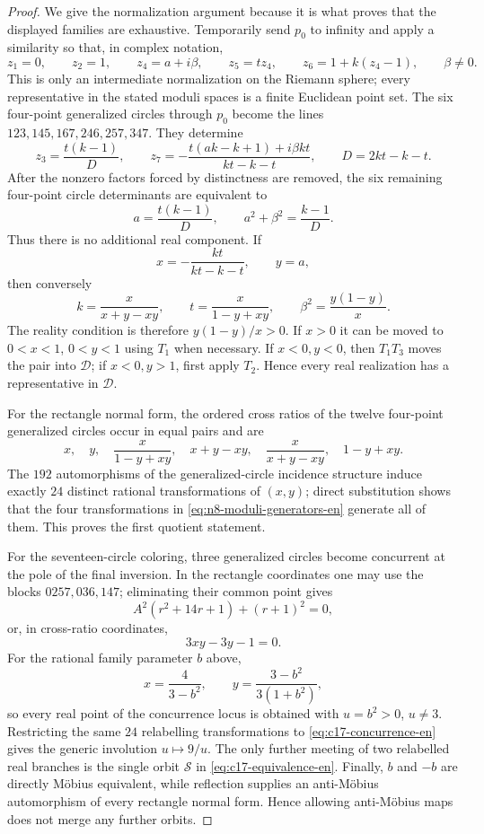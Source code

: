 \documentclass[11pt,a4paper]{article}
\theoremstyle{definition}
\begin{document}
\begin{proof}
We give the normalization argument because it is what proves that the displayed
families are exhaustive.  Temporarily send $p_0$ to infinity and apply a
similarity so that, in complex notation,
\[
z_1=0,\qquad z_2=1,\qquad z_4=a+i\beta,\qquad
z_5=t z_4,\qquad z_6=1+k(z_4-1),\qquad \beta\ne0.
\]
This is only an intermediate normalization on the Riemann sphere; every
representative in the stated moduli spaces is a finite Euclidean point set.
The six four-point generalized circles through $p_0$ become the lines
$123,145,167,246,257,347$.  They determine
\[
 z_3=\frac{t(k-1)}{D},\qquad
 z_7=-\frac{t(ak-k+1)+i\beta kt}{kt-k-t},\qquad
 D=2kt-k-t.
\]
After the nonzero factors forced by distinctness are removed, the six remaining
four-point circle determinants are equivalent to
\begin{equation}\label{eq:n8-normalized-equations-en}
 a=\frac{t(k-1)}D,\qquad a^2+\beta^2=\frac{k-1}D.
\end{equation}
Thus there is no additional real component.  If
\[
 x=-\frac{kt}{kt-k-t},\qquad y=a,
\]
then conversely
\[
k=\frac{x}{x+y-xy},\qquad
t=\frac{x}{1-y+xy},\qquad
\beta^2=\frac{y(1-y)}x.
\]
The reality condition is therefore $y(1-y)/x>0$.  If $x>0$ it can be moved to
$0<x<1$, $0<y<1$ using $T_1$ when necessary.  If $x<0,y<0$, then
$T_1T_3$ moves the pair into $\mathcal D$; if $x<0,y>1$, first apply $T_2$.
Hence every real realization has a representative in $\mathcal D$.

For the rectangle normal form, the ordered cross ratios of the twelve
four-point generalized circles occur in equal pairs and are
\[
x,\quad y,\quad \frac{x}{1-y+xy},\quad x+y-xy,
\quad\frac{x}{x+y-xy},\quad1-y+xy.
\]
The $192$ automorphisms of the generalized-circle incidence structure induce
exactly $24$ distinct rational transformations of $(x,y)$; direct substitution
shows that the four transformations in
\eqref{eq:n8-moduli-generators-en} generate all of them.  This proves the first
quotient statement.

For the seventeen-circle coloring, three generalized circles become concurrent
at the pole of the final inversion.  In the rectangle coordinates one may use
the blocks $0257,036,147$; eliminating their common point gives
\[
A^2(r^2+14r+1)+(r+1)^2=0,
\]
or, in cross-ratio coordinates,
\begin{equation}\label{eq:c17-concurrence-en}
3xy-3y-1=0.
\end{equation}
For the rational family parameter $b$ above,
\[
x=\frac4{3-b^2},\qquad
y=\frac{3-b^2}{3(1+b^2)},
\]
so every real point of the concurrence locus is obtained with
$u=b^2>0$, $u\ne3$.  Restricting the same $24$ relabelling transformations to
\eqref{eq:c17-concurrence-en} gives the generic involution $u\mapsto9/u$.
The only further meeting of two relabelled real branches is the single orbit
$\mathcal S$ in \eqref{eq:c17-equivalence-en}.  Finally, $b$ and $-b$ are
directly Möbius equivalent, while reflection supplies an anti-Möbius
automorphism of every rectangle normal form.  Hence allowing anti-Möbius maps
does not merge any further orbits.
\end{proof}
\end{document}
